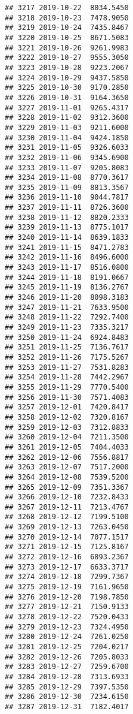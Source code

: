 \documentclass[
]{article}
\begin{document}
\begin{verbatim}
## 3217 2019-10-22  8034.5450
## 3218 2019-10-23  7478.9050
## 3219 2019-10-24  7435.8467
## 3220 2019-10-25  8671.5083
## 3221 2019-10-26  9261.9983
## 3222 2019-10-27  9555.3050
## 3223 2019-10-28  9223.2067
## 3224 2019-10-29  9437.5850
## 3225 2019-10-30  9170.2850
## 3226 2019-10-31  9164.3650
## 3227 2019-11-01  9265.4317
## 3228 2019-11-02  9312.3600
## 3229 2019-11-03  9211.6000
## 3230 2019-11-04  9424.1850
## 3231 2019-11-05  9326.6033
## 3232 2019-11-06  9345.6900
## 3233 2019-11-07  9205.8083
## 3234 2019-11-08  8770.3617
## 3235 2019-11-09  8813.3567
## 3236 2019-11-10  9044.7817
## 3237 2019-11-11  8726.3600
## 3238 2019-11-12  8820.2333
## 3239 2019-11-13  8775.1017
## 3240 2019-11-14  8639.1833
## 3241 2019-11-15  8471.2783
## 3242 2019-11-16  8496.6000
## 3243 2019-11-17  8516.0800
## 3244 2019-11-18  8191.0667
## 3245 2019-11-19  8136.2767
## 3246 2019-11-20  8098.3183
## 3247 2019-11-21  7633.9500
## 3248 2019-11-22  7292.7400
## 3249 2019-11-23  7335.3217
## 3250 2019-11-24  6924.8483
## 3251 2019-11-25  7136.7617
## 3252 2019-11-26  7175.5267
## 3253 2019-11-27  7531.8283
## 3254 2019-11-28  7442.2967
## 3255 2019-11-29  7770.5400
## 3256 2019-11-30  7571.4083
## 3257 2019-12-01  7420.8417
## 3258 2019-12-02  7320.8167
## 3259 2019-12-03  7312.8833
## 3260 2019-12-04  7211.3500
## 3261 2019-12-05  7404.4033
## 3262 2019-12-06  7556.8817
## 3263 2019-12-07  7517.2000
## 3264 2019-12-08  7539.5200
## 3265 2019-12-09  7351.3367
## 3266 2019-12-10  7232.8433
## 3267 2019-12-11  7213.4767
## 3268 2019-12-12  7199.5100
## 3269 2019-12-13  7263.0450
## 3270 2019-12-14  7077.1517
## 3271 2019-12-15  7125.8167
## 3272 2019-12-16  6893.2367
## 3273 2019-12-17  6633.3717
## 3274 2019-12-18  7299.7367
## 3275 2019-12-19  7161.9650
## 3276 2019-12-20  7198.7850
## 3277 2019-12-21  7150.9133
## 3278 2019-12-22  7520.0433
## 3279 2019-12-23  7324.4950
## 3280 2019-12-24  7261.0250
## 3281 2019-12-25  7204.0217
## 3282 2019-12-26  7205.8033
## 3283 2019-12-27  7259.6700
## 3284 2019-12-28  7313.6933
## 3285 2019-12-29  7397.5350
## 3286 2019-12-30  7234.6150
## 3287 2019-12-31  7182.4017
\end{verbatim}
\end{document}
